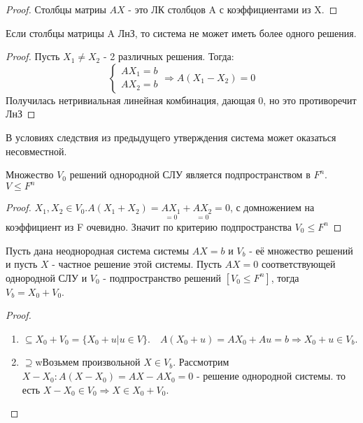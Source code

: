 \begin{proof}
	Столбцы матриы \(AX\) - это ЛК столбцов A с коэффициентами из X.
\end{proof}
\begin{corollary}
	Если столбцы матрицы A ЛнЗ, то система не может иметь более одного решения.
\end{corollary}
\begin{proof}
	Пусть \(X_1\ne X_2 \) - 2 различных решения. Тогда: 
	\[\left\{\begin{gathered}
		AX_1 = b \\
		AX_2 = b 
	\end{gathered}\right.\Longrightarrow A(X_1 - X_2) = 0 \]
	Получилась нетривиальная линейная комбинация, дающая 0, но это противоречит ЛнЗ
\end{proof}
\begin{note}
	В условиях следствия из предыдущего утверждения система может оказаться несовместной.
\end{note}

\begin{proposition}
	Множество \(V_0\) решений однородной СЛУ является подпространством в \(F^n\). \(V\le F^n\)
\end{proposition}
\begin{proof}
	\(X_1, X_2 \in V_0.A(X_1 + X_2) = \underset{=0}{AX_1} + \underset{=0}{AX_2} = 0\), с домножением на коэффициент из F очевидно. Значит по критерию подпространства \(V_0 \le F^n\)
\end{proof}
\begin{proposition}
	Пусть дана неоднородная система системы \(AX = b\) и \(V_b\) - её множество решений и пусть \(X\) - частное решение этой системы. Пусть \(AX = 0\) соответствующей однородной СЛУ и \(V_0\) - подпространство решений \([V_0 \le F^n]\), тогда \(V_b = X_0 + V_0\).
\end{proposition}
\begin{proof}
	\begin{enumerate}
		\item \( \subseteq X_0 + V_0 = \{X_0 + u | u\in V\}.\quad A(X_0 + u) = AX_0 + Au = b\Longrightarrow X_0+u\in V_b\).
		\item \(\supseteq\)wВозьмем произвольной \(X\in V_b\). Рассмотрим \(X - X_0: A(X - X_0) = AX - AX_0 = 0\) - решение однородной системы. то есть \(X-X_0 \in V_0 \Longrightarrow X\in X_0 + V_0\).
	\end{enumerate}
\end{proof}

